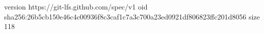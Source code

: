 version https://git-lfs.github.com/spec/v1
oid sha256:26b5cb150e46c4c00936f8c3caf1c7a3c700a23ed0921df806823ffc201d8056
size 118
